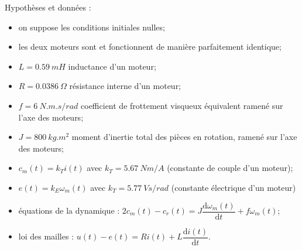 Hypothèses et données :
\begin{itemize}
\item on suppose les conditions initiales nulles;
\item les deux moteurs sont et fonctionnent de manière parfaitement identique;
\item $L=\SI{0,59}{mH}$ inductance d’un moteur;
\item $R=\SI{0,0386}{\Omega}$ résistance interne d’un moteur;
\item $f=\SI{6}{N.m.s/rad}$ coefficient de frottement visqueux équivalent ramené sur l’axe des moteurs;
\item $J=\SI{800}{kg.m^2}$ moment d’inertie total des pièces en rotation, ramené sur l’axe des moteurs; 
\item $c_m(t)=k_Ti(t)$ avec $k_T=\SI{5.67}{Nm/A}$ (constante de couple d’un moteur);
\item $e(t)=k_E\omega_m(t)$ avec $k_T=\SI{5.77}{Vs/rad}$   (constante électrique d’un moteur)
\item équations de la dynamique : $2c_m(t)-c_r(t)=J\dfrac{\text{d}\omega_m(t)}{{\text{d}}t}+f\omega_m(t)$;
\item loi des mailles : $u(t)-e(t)=Ri(t)+L\dfrac{\text{d}i(t)}{\text{d}t}$.

\end{itemize}





